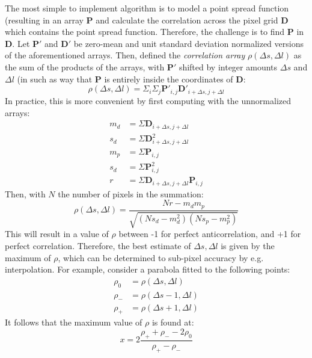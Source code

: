 The most simple to implement algorithm is to model a point spread function (resulting in an array $\mathbf{P}$ and calculate the correlation across the pixel grid $\mathbf{D}$ which contains the point spread function. Therefore, the challenge is to find $\mathbf{P}$ in $\mathbf{D}$. Let $\mathbf{P'}$ and $\mathbf{D'}$ be zero-mean and unit standard deviation normalized versions of the aforementioned arrays. Then, \cite{OpNav} defined the \textit{correlation array} $\rho(\Delta s, \Delta l)$ as the sum of the products of the arrays, with $\mathbf{P'}$ shifted by integer amounts $\Delta s$ and $\Delta l$ (in such as way that $\mathbf{P}$ is entirely inside the coordinates of $\mathbf{D}$:
\begin{equation}
    \rho(\Delta s, \Delta l) = \Sigma_i \Sigma_j \mathbf{P'}_{i,j} \mathbf{D'}_{i+\Delta s, j+\Delta l}
\end{equation}
In practice, this is more convenient by first computing with the unnormalized arrays:
\begin{align}
    m_d &= \Sigma \mathbf{D}_{i+\Delta s, j+\Delta l} \\
    s_d &= \Sigma \mathbf{D}^2_{i + \Delta s, j+\Delta l} \\
    m_p &= \Sigma \mathbf{P}_{i,j} \\
    s_d &= \Sigma \mathbf{P}^2_{i, j} \\
    r &= \Sigma \mathbf{D}_{i+\Delta s, j+\Delta l} \mathbf{P}_{i,j}
\end{align}
Then, with $N$ the number of pixels in the summation:
\begin{equation}
    \rho(\Delta s, \Delta l) = \frac{Nr - m_d m_p}{\sqrt{\left(Ns_d - m_d^2\right)\left(Ns_p - m_p^2\right)}}
\end{equation}
This will result in a value of $\rho$ between -1 for perfect anticorrelation, and +1 for perfect correlation. Therefore, the best estimate of $\Delta s, \Delta l$ is given by the maximum of $\rho$, which can be determined to sub-pixel accuracy by e.g. interpolation. For example, consider a parabola fitted to the following points:
\begin{align}
    \rho_0 &= \rho(\Delta s, \Delta l) \\
    \rho_- &= \rho(\Delta s-1, \Delta l) \\
    \rho_+ &= \rho(\Delta s+1, \Delta l)
\end{align}
It follows that the maximum value of $\rho$ is found at:
\begin{equation}
    x = 2\frac{\rho_+ + \rho_- - 2\rho_0}{\rho_+ - \rho_-}
\end{equation}
